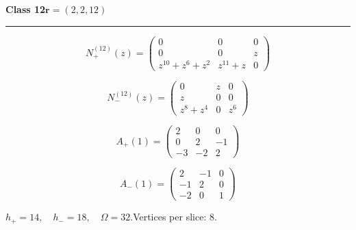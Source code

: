 \noindent\begin{minipage}{\linewidth}
\noindent\textbf{Class 12}\hfill $\symbf{r}=(2,2,12)$
\par\smallskip\noindent\textcolor{rulegray}{\rule{\linewidth}{0.3pt}}
\begin{minipage}[c]{0.495\linewidth}\centering\fontsize{10.5}{13}\selectfont
\setlength{\abovedisplayskip}{3pt}\setlength{\belowdisplayskip}{3pt}
\setlength{\abovedisplayshortskip}{3pt}\setlength{\belowdisplayshortskip}{3pt}
\setlength{\arraycolsep}{3.5pt}\renewcommand{\arraystretch}{1.18}
\[N_{+}^{(12)}(z)=\begin{pmatrix}0 & 0 & 0\\0 & 0 & z\\z^{10} + z^{6} + z^{2} & z^{11} + z & 0\end{pmatrix}\]
\end{minipage}%
\begin{minipage}[c]{0.495\linewidth}\centering\fontsize{10.5}{13}\selectfont
\setlength{\abovedisplayskip}{3pt}\setlength{\belowdisplayskip}{3pt}
\setlength{\abovedisplayshortskip}{3pt}\setlength{\belowdisplayshortskip}{3pt}
\setlength{\arraycolsep}{3.5pt}\renewcommand{\arraystretch}{1.18}
\[N_{-}^{(12)}(z)=\begin{pmatrix}0 & z & 0\\z & 0 & 0\\z^{8} + z^{4} & 0 & z^{6}\end{pmatrix}\]
\end{minipage}%
\par\noindent
\begin{minipage}[c]{0.495\linewidth}\centering\fontsize{10.5}{13}\selectfont
\setlength{\abovedisplayskip}{3pt}\setlength{\belowdisplayskip}{3pt}
\setlength{\abovedisplayshortskip}{3pt}\setlength{\belowdisplayshortskip}{3pt}
\setlength{\arraycolsep}{3.5pt}\renewcommand{\arraystretch}{1.18}
\[A_{+}(1)=\begin{pmatrix}2 & 0 & 0\\0 & 2 & -1\\-3 & -2 & 2\end{pmatrix}\]
\end{minipage}%
\begin{minipage}[c]{0.495\linewidth}\centering\fontsize{10.5}{13}\selectfont
\setlength{\abovedisplayskip}{3pt}\setlength{\belowdisplayskip}{3pt}
\setlength{\abovedisplayshortskip}{3pt}\setlength{\belowdisplayshortskip}{3pt}
\setlength{\arraycolsep}{3.5pt}\renewcommand{\arraystretch}{1.18}
\[A_{-}(1)=\begin{pmatrix}2 & -1 & 0\\-1 & 2 & 0\\-2 & 0 & 1\end{pmatrix}\]
\end{minipage}%
\par\smallskip\noindent\small $h_+=14,\quad h_-=18,\quad \Omega=32.$\quad Vertices per slice: 8.
\end{minipage}\par\vfill
\clearpage

